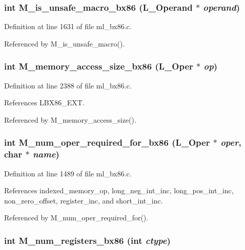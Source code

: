 \subsubsection{\setlength{\rightskip}{0pt plus 5cm}int M\_\-is\_\-unsafe\_\-macro\_\-bx86 (L\_\-Operand $\ast$ {\em operand})}\label{ml__bx86_8c_1641727022261783bf341bb62216872b}




Definition at line 1631 of file ml\_\-bx86.c.

Referenced by M\_\-is\_\-unsafe\_\-macro().
\subsubsection{\setlength{\rightskip}{0pt plus 5cm}int M\_\-memory\_\-access\_\-size\_\-bx86 (L\_\-Oper $\ast$ {\em op})}\label{ml__bx86_8c_fdf7accdeedba6010af1be1d4758a219}




Definition at line 2388 of file ml\_\-bx86.c.

References LBX86\_\-EXT.

Referenced by M\_\-memory\_\-access\_\-size().
\subsubsection{\setlength{\rightskip}{0pt plus 5cm}int M\_\-num\_\-oper\_\-required\_\-for\_\-bx86 (L\_\-Oper $\ast$ {\em oper}, char $\ast$ {\em name})}\label{ml__bx86_8c_53c0f60a4d9e96d06f27d77bbe81a130}




Definition at line 1489 of file ml\_\-bx86.c.

References indexed\_\-memory\_\-op, long\_\-neg\_\-int\_\-inc, long\_\-pos\_\-int\_\-inc, non\_\-zero\_\-offset, register\_\-inc, and short\_\-int\_\-inc.

Referenced by M\_\-num\_\-oper\_\-required\_\-for().
\subsubsection{\setlength{\rightskip}{0pt plus 5cm}int M\_\-num\_\-registers\_\-bx86 (int {\em ctype})}\label{ml__bx86_8c_ed639861180b50ad6923f4bdac8b2ed4}




